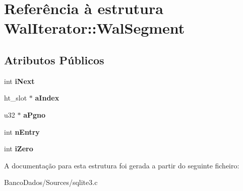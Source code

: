 \hypertarget{struct_wal_iterator_1_1_wal_segment}{\section{Referência à estrutura Wal\-Iterator\-:\-:Wal\-Segment}
\label{struct_wal_iterator_1_1_wal_segment}
}
\subsection*{Atributos Públicos}
\begin{DoxyCompactItemize}
\item 
\hypertarget{struct_wal_iterator_1_1_wal_segment_a329c939b196f907fe98cf762bb07d291}{int {\bfseries i\-Next}}\label{struct_wal_iterator_1_1_wal_segment_a329c939b196f907fe98cf762bb07d291}

\item 
\hypertarget{struct_wal_iterator_1_1_wal_segment_adec397836a127acafcc551cb1fdcd851}{ht\-\_\-slot $\ast$ {\bfseries a\-Index}}\label{struct_wal_iterator_1_1_wal_segment_adec397836a127acafcc551cb1fdcd851}

\item 
\hypertarget{struct_wal_iterator_1_1_wal_segment_a5e43273a11dc5856934834c0cdf7f198}{u32 $\ast$ {\bfseries a\-Pgno}}\label{struct_wal_iterator_1_1_wal_segment_a5e43273a11dc5856934834c0cdf7f198}

\item 
\hypertarget{struct_wal_iterator_1_1_wal_segment_ad80cf479aa670eda7aa1adee607af7d9}{int {\bfseries n\-Entry}}\label{struct_wal_iterator_1_1_wal_segment_ad80cf479aa670eda7aa1adee607af7d9}

\item 
\hypertarget{struct_wal_iterator_1_1_wal_segment_a3eedec5e8e8dd94be670d50ac144a959}{int {\bfseries i\-Zero}}\label{struct_wal_iterator_1_1_wal_segment_a3eedec5e8e8dd94be670d50ac144a959}

\end{DoxyCompactItemize}


A documentação para esta estrutura foi gerada a partir do seguinte ficheiro\-:\begin{DoxyCompactItemize}
\item 
Banco\-Dados/\-Sources/sqlite3.\-c\end{DoxyCompactItemize}

